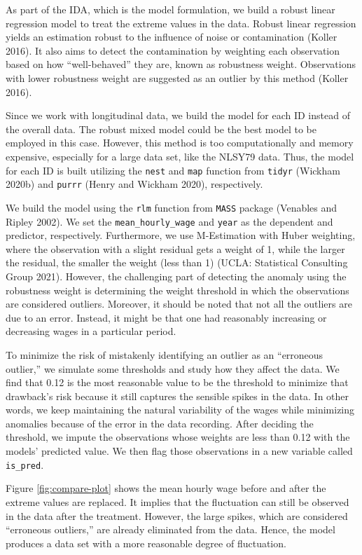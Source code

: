 \documentclass{article}
\begin{document}
As part of the IDA, which is the model formulation, we build a robust linear regression model to treat the extreme values in the data. Robust linear regression yields an estimation robust to the influence of noise or contamination (Koller 2016). It also aims to detect the contamination by weighting each observation based on how ``well-behaved'' they are, known as robustness weight. Observations with lower robustness weight are suggested as an outlier by this method (Koller 2016).

Since we work with longitudinal data, we build the model for each ID instead of the overall data. The robust mixed model could be the best model to be employed in this case. However, this method is too computationally and memory expensive, especially for a large data set, like the NLSY79 data. Thus, the model for each ID is built utilizing the \texttt{nest} and \texttt{map} function from \texttt{tidyr} (Wickham 2020b) and \texttt{purrr} (Henry and Wickham 2020), respectively.

We build the model using the \texttt{rlm} function from \texttt{MASS} package (Venables and Ripley 2002). We set the \texttt{mean\_hourly\_wage} and \texttt{year} as the dependent and predictor, respectively. Furthermore, we use M-Estimation with Huber weighting, where the observation with a slight residual gets a weight of 1, while the larger the residual, the smaller the weight (less than 1) (UCLA: Statistical Consulting Group 2021). However, the challenging part of detecting the anomaly using the robustness weight is determining the weight threshold in which the observations are considered outliers. Moreover, it should be noted that not all the outliers are due to an error. Instead, it might be that one had reasonably increasing or decreasing wages in a particular period.

To minimize the risk of mistakenly identifying an outlier as an ``erroneous outlier,'' we simulate some thresholds and study how they affect the data. We find that 0.12 is the most reasonable value to be the threshold to minimize that drawback's risk because it still captures the sensible spikes in the data. In other words, we keep maintaining the natural variability of the wages while minimizing anomalies because of the error in the data recording. After deciding the threshold, we impute the observations whose weights are less than 0.12 with the models' predicted value. We then flag those observations in a new variable called \texttt{is\_pred}.

Figure \ref{fig:compare-plot} shows the mean hourly wage before and after the extreme values are replaced. It implies that the fluctuation can still be observed in the data after the treatment. However, the large spikes, which are considered ``erroneous outliers,'' are already eliminated from the data. Hence, the model produces a data set with a more reasonable degree of fluctuation.
\end{document}
